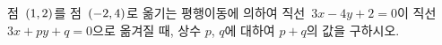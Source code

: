 점~$(1{,}\mkern3mu\mathopen{}2)$를 점~$(-2{,}\mkern3mu\mathopen{}4)$로 옮기는 평행이동에 의하여 직선~$3x-4y+2=0$이 직선~$3x+py+q=0$으로 옮겨질 때, 상수 $p$, $q$에 대하여 $p+q$의 값을 구하시오.
